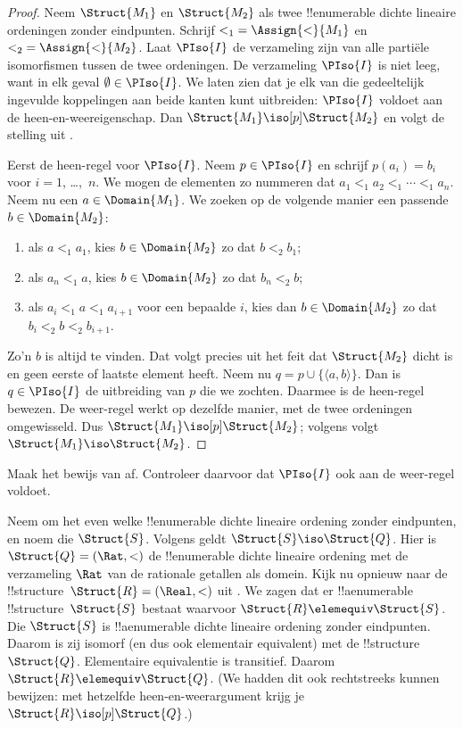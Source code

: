 \documentclass[../../../include/open-logic-section]{subfiles}
\begin{document}
\begin{proof}
  Neem $\Struct{M_1}$ en $\Struct{M_2}$ als twee !!{enumerable} dichte lineaire
  ordeningen zonder eindpunten. Schrijf ${<_1} = \Assign{<}{M_1}$ en ${<_2} =
  \Assign{<}{M_2}$. Laat $\PIso{I}$ de verzameling zijn van alle partiële
  isomorfismen tussen de twee ordeningen. De verzameling $\PIso{I}$ is niet leeg, want
  in elk geval $\emptyset \in \PIso{I}$. We laten zien dat je elk van die
  gedeeltelijk ingevulde koppelingen aan beide kanten kunt uitbreiden: $\PIso{I}$
  voldoet aan de heen-en-weereigenschap. Dan $\Struct{M_1} \iso[p] \Struct{M_2}$
  en volgt de stelling uit .

  Eerst de heen-regel voor $\PIso{I}$. Neem $p \in
  \PIso{I}$ en schrijf $p(a_i) = b_i$ voor $i = 1$, \dots,~$n$.
  We mogen de elementen zo nummeren dat $a_1 <_1 a_2 <_1 \cdots <_1
  a_n$. Neem nu een $a \in \Domain{M_1}$. We zoeken op de volgende
  manier een passende $b \in \Domain{M_2}$:
  \begin{enumerate}
  \item als $a <_1 a_1$, kies $b \in \Domain{M_2}$ zo dat $b <_2
    b_1$;
  \item als $a_n <_1 a$, kies $b \in \Domain{M_2}$ zo dat $b_n <_2 b$;
 \item als $a_i <_1 a <_1 a_{i+1}$ voor een bepaalde $i$, kies dan $b \in
   \Domain{M_2}$ zo dat $b_i <_2 b <_2 b_{i+1}$.
  \end{enumerate}
  Zo'n $b$ is altijd te vinden. Dat volgt precies uit het feit dat
  $\Struct{M_2}$ dicht is en geen eerste of laatste element heeft. Neem nu
  $q = p \cup \{ \langle a, b \rangle \}$. Dan is $q \in \PIso{I}$ de
  uitbreiding van $p$ die we zochten. Daarmee is de heen-regel bewezen.
  De weer-regel werkt op dezelfde manier, met de twee ordeningen omgewisseld.
  Dus $\Struct{M_1} \iso[p] \Struct{M_2}$; volgens
   volgt $\Struct{M_1} \iso \Struct{M_2}$.
\end{proof}

\begin{prob}
  Maak het bewijs van  af. Controleer
  daarvoor dat $\PIso{I}$ ook aan de weer-regel voldoet.
\end{prob}

\begin{rem}
  Neem om het even welke !!{enumerable} dichte lineaire ordening zonder
  eindpunten, en noem die $\Struct{S}$. Volgens  geldt
  $\Struct{S} \iso \Struct{Q}$. Hier is
  $\Struct{Q} = (\Rat, <)$ de !!{enumerable} dichte lineaire ordening met
  de verzameling $\Rat$ van de rationale getallen als domein. Kijk nu opnieuw
  naar de !!{structure}~$\Struct{R} = (\Real, <)$ uit
  . We zagen dat er !!a{enumerable}
  !!{structure}~$\Struct{S}$ bestaat waarvoor $\Struct{R} \elemequiv
  \Struct{S}$. Die $\Struct{S}$ is !!a{enumerable} dichte lineaire ordening
  zonder eindpunten. Daarom is zij isomorf (en dus ook elementair equivalent)
  met de !!{structure}~$\Struct{Q}$. Elementaire equivalentie
  is transitief. Daarom $\Struct{R} \elemequiv \Struct{Q}$. (We hadden dit
  ook rechtstreeks kunnen bewijzen: met hetzelfde heen-en-weerargument krijg
  je $\Struct{R} \iso[p] \Struct{Q}$.)
\end{rem}
\end{document}
